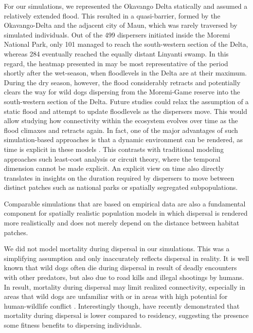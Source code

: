 \documentclass[abstract=on,10pt,a4paper,bibliography=totocnumbered]{article}
\begin{document}
For our simulations, we represented the Okavango Delta statically and assumed a
relatively extended flood. This resulted in a quasi-barrier, formed by the
Okavango-Delta and the adjacent city of Maun, which was rarely traversed by
simulated individuals. Out of the 499 dispersers initiated inside the Moremi
National Park, only 101 managed to reach the south-western section of the Delta,
whereas 284 eventually reached the equally distant Linyanti swamp. In this
regard, the heatmap presented in  may be most representative of
the period shortly after the wet-season, when floodlevels in the Delta are at
their maximum. During the dry season, however, the flood considerably retracts
and potentially clears the way for wild dogs dispersing from the Moremi-Game
reserve into the south-western section of the Delta. Future studies could relax
the assumption of a static flood and attempt to update floodlevels as the
dispersers move. This would allow studying how connectivity within the ecosystem
evolves over time as the flood climaxes and retracts again. In fact, one of the
major advantages of such simulation-based approaches is that a dynamic
environment can be rendered, as time is explicit in these models
\citep{Zeller.2020}. This contrasts with traditional modeling approaches such
least-cost analysis or circuit theory, where the temporal dimension cannot be
made explicit. An explicit view on time also directly translates in insights on
the duration required by dispersers to move between distinct patches such as
national parks or spatially segregated subpopulations.

Comparable simulations that are based on empirical data are also a fundamental
component for spatially realistic population models in which dispersal is
rendered more realistically and does not merely depend on the distance between
habitat patches.

We did not model mortality during dispersal in our simulations. This was a
simplifying assumption and only inaccurately reflects dispersal in reality. It
is well known that wild dogs often die during dispersal in result of deadly
encounters with other predators, but also due to road kills and illegal
shootings by humans. In result, mortality during dispersal may limit realized
connectivity, especially in areas that wild dogs are unfamiliar with or in areas
with high potential for human-wildlife conflict \citep{Cozzi.2020}.
Interestingly though, \cite{Behr.2021} have recently demonstrated that mortality
during dispersal is lower compared to residency, suggesting the presence some
fitness benefits to dispersing individuals.
\end{document}
